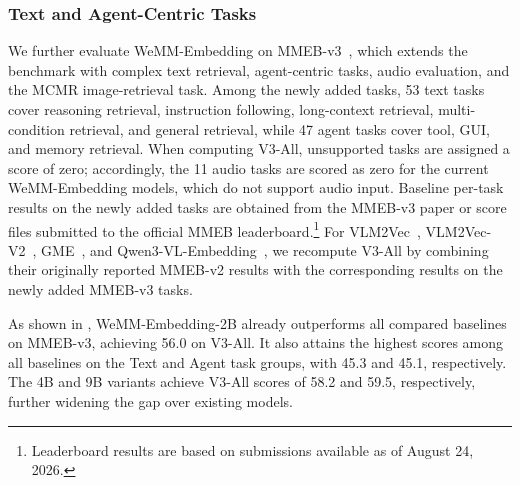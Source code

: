 \documentclass[]{wechat}
\begin{document}
\subsubsection{Text and Agent-Centric Tasks}
\label{subsec:text_agent_retrieval}

We further evaluate WeMM-Embedding on MMEB-v3~\cite{mmeb-v3}, which extends the benchmark with complex text retrieval, agent-centric tasks, audio evaluation, and the MCMR image-retrieval task. Among the newly added tasks, 53 text tasks cover reasoning retrieval, instruction following, long-context retrieval, multi-condition retrieval, and general retrieval, while 47 agent tasks cover tool, GUI, and memory retrieval. When computing V3-All, unsupported tasks are assigned a score of zero; accordingly, the 11 audio tasks are scored as zero for the current WeMM-Embedding models, which do not support audio input. Baseline per-task results on the newly added tasks are obtained from the MMEB-v3 paper or score files submitted to the official MMEB leaderboard.\footnote{Leaderboard results are based on submissions available as of August 24, 2026.} For VLM2Vec~\cite{vlm2vec2024}, VLM2Vec-V2~\cite{vlm2vec-v2}, GME~\cite{zhang2024gme}, and Qwen3-VL-Embedding~\cite{qwen3vl-emb}, we recompute V3-All by combining their originally reported MMEB-v2 results with the corresponding results on the newly added MMEB-v3 tasks.

As shown in , WeMM-Embedding-2B already outperforms all compared baselines on MMEB-v3, achieving 56.0 on V3-All. It also attains the highest scores among all baselines on the Text and Agent task groups, with 45.3 and 45.1, respectively. The 4B and 9B variants achieve V3-All scores of 58.2 and 59.5, respectively, further widening the gap over existing models.
\end{document}
